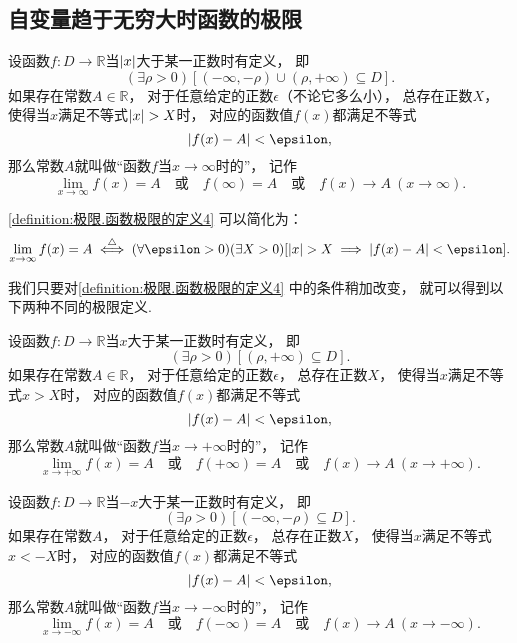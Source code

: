 \subsection{自变量趋于无穷大时函数的极限}
\begin{definition}\label{definition:极限.函数极限的定义4}
设函数\(f\colon D\to\mathbb{R}\)当\(\abs{x}\)大于某一正数时有定义，
即\[
	(\exists\rho>0)
	[(-\infty,-\rho)\cup(\rho,+\infty) \subseteq D].
\]
如果存在常数\(A\in\mathbb{R}\)，
对于任意给定的正数\(\epsilon\)（不论它多么小），
总存在正数\(X\)，
使得当\(x\)满足不等式\(\abs{x} > X\)时，
对应的函数值\(f(x)\)都满足不等式\[
	\abs{f(x) - A} < \epsilon,
\]
那么常数\(A\)就叫做“函数\(f\)当\(x \to \infty\)时的”，
记作\[
	\lim_{x \to \infty} f(x) = A
	\quad\text{或}\quad
	f(\infty) = A
	\quad\text{或}\quad
	f(x) \to A\ (x \to \infty).
\]
\end{definition}
\cref{definition:极限.函数极限的定义4} 可以简化为：\[
	\lim_{x\to\infty} f(x) = A
	\defiff
	(\forall\epsilon>0)
	(\exists X>0)
	[
		\abs{x} > X
		\implies
		\abs{f(x) - A} < \epsilon
	].
\]

我们只要对\cref{definition:极限.函数极限的定义4} 中的条件稍加改变，
就可以得到以下两种不同的极限定义.
\begin{definition}\label{definition:极限.函数极限的定义5}
设函数\(f\colon D\to\mathbb{R}\)当\(x\)大于某一正数时有定义，
即\[
	(\exists\rho>0)
	[(\rho,+\infty) \subseteq D].
\]
如果存在常数\(A\in\mathbb{R}\)，
对于任意给定的正数\(\epsilon\)，
总存在正数\(X\)，
使得当\(x\)满足不等式\(x > X\)时，
对应的函数值\(f(x)\)都满足不等式\[
	\abs{f(x) - A} < \epsilon,
\]
那么常数\(A\)就叫做“函数\(f\)当\(x \to +\infty\)时的”，
记作\[
	\lim_{x \to +\infty} f(x) = A
	\quad\text{或}\quad
	f(+\infty) = A
	\quad\text{或}\quad
	f(x) \to A\ (x \to +\infty).
\]
\end{definition}

\begin{definition}\label{definition:极限.函数极限的定义6}
设函数\(f\colon D\to\mathbb{R}\)当\(-x\)大于某一正数时有定义，
即\[
	(\exists\rho>0)
	[(-\infty,-\rho) \subseteq D].
\]
如果存在常数\(A\)，
对于任意给定的正数\(\epsilon\)，
总存在正数\(X\)，
使得当\(x\)满足不等式\(x < -X\)时，
对应的函数值\(f(x)\)都满足不等式\[
	\abs{f(x) - A} < \epsilon,
\]
那么常数\(A\)就叫做“函数\(f\)当\(x \to -\infty\)时的”，
记作\[
	\lim_{x \to -\infty} f(x) = A
	\quad\text{或}\quad
	f(-\infty) = A
	\quad\text{或}\quad
	f(x) \to A\ (x \to -\infty).
\]
\end{definition}

